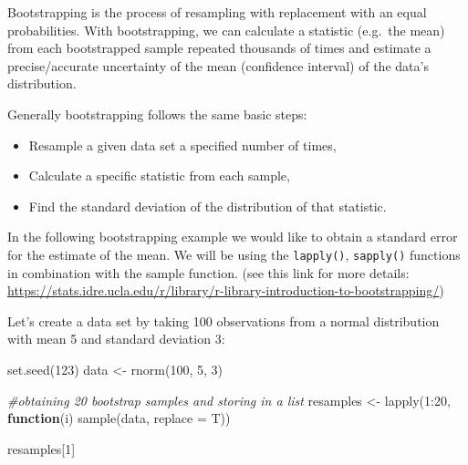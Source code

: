 \documentclass[
]{book}
\newenvironment{Shaded}{\begin{snugshade}}{\end{snugshade}}
\newcommand{\AttributeTok}[1]{\textcolor[rgb]{0.77,0.63,0.00}{#1}}
\newcommand{\CommentTok}[1]{\textcolor[rgb]{0.56,0.35,0.01}{\textit{#1}}}
\newcommand{\ControlFlowTok}[1]{\textcolor[rgb]{0.13,0.29,0.53}{\textbf{#1}}}
\newcommand{\DecValTok}[1]{\textcolor[rgb]{0.00,0.00,0.81}{#1}}
\newcommand{\FunctionTok}[1]{\textcolor[rgb]{0.00,0.00,0.00}{#1}}
\newcommand{\NormalTok}[1]{#1}
\newcommand{\OtherTok}[1]{\textcolor[rgb]{0.56,0.35,0.01}{#1}}
\newcommand{\SpecialCharTok}[1]{\textcolor[rgb]{0.00,0.00,0.00}{#1}}
\providecommand{\tightlist}{%
  \setlength{\itemsep}{0pt}\setlength{\parskip}{0pt}}
\begin{document}
Bootstrapping is the process of resampling with replacement with an equal probabilities. With bootstrapping, we can calculate a statistic (e.g.~the mean) from each bootstrapped sample repeated thousands of times and estimate a precise/accurate uncertainty of the mean (confidence interval) of the data's distribution.

Generally bootstrapping follows the same basic steps:

\begin{itemize}
\tightlist
\item
  Resample a given data set a specified number of times,\\
\item
  Calculate a specific statistic from each sample,\\
\item
  Find the standard deviation of the distribution of that statistic.
\end{itemize}

In the following bootstrapping example we would like to obtain a standard error for the estimate of the mean. We will be using the \texttt{lapply()}, \texttt{sapply()} functions in combination with the sample function. (see this link for more details: \url{https://stats.idre.ucla.edu/r/library/r-library-introduction-to-bootstrapping/})\citep{UCLA_2021}

Let's create a data set by taking 100 observations from a normal distribution with mean 5 and standard deviation 3:

\begin{Shaded}
\begin{Highlighting}[]
\FunctionTok{set.seed}\NormalTok{(}\DecValTok{123}\NormalTok{)}
\NormalTok{data }\OtherTok{\textless{}{-}} \FunctionTok{rnorm}\NormalTok{(}\DecValTok{100}\NormalTok{, }\DecValTok{5}\NormalTok{, }\DecValTok{3}\NormalTok{) }

\CommentTok{\#obtaining 20 bootstrap samples and storing in a list}
\NormalTok{resamples }\OtherTok{\textless{}{-}} \FunctionTok{lapply}\NormalTok{(}\DecValTok{1}\SpecialCharTok{:}\DecValTok{20}\NormalTok{, }\ControlFlowTok{function}\NormalTok{(i) }\FunctionTok{sample}\NormalTok{(data, }\AttributeTok{replace =}\NormalTok{ T))}

\NormalTok{resamples[}\DecValTok{1}\NormalTok{]}
\end{Highlighting}
\end{Shaded}
\end{document}
